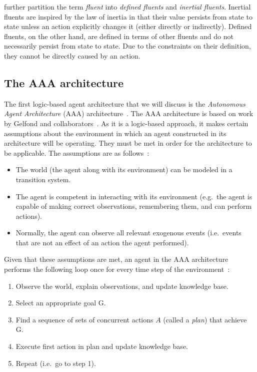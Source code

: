 \citet{gelfond_knowledge_2014} further partition the term \textit{fluent} into \textit{defined fluents} and \textit{inertial fluents}.
Inertial fluents are inspired by the law of inertia in that their value persists from state to state unless an action explicitly changes it (either directly or indirectly).
Defined fluents, on the other hand, are defined in terms of other fluents and do not necessarily persist from state to state.
Due to the constraints on their definition, they cannot be directly caused by an action.


\subsection{The AAA architecture}
\label{subsec:aaa_architecture}

The first logic-based agent architecture that we will discuss is the \textit{Autonomous Agent Architecture} (AAA) architecture~\citep{balduccini_aaa_2008}.
The AAA architecture is based on work by Gelfond and collaborators~\citep{baral_reasoning_2000,balduccini_diagnostic_2003, balduccini_answer_2006,balduccini_learning_2007}.
As it is a logic-based approach, it makes certain assumptions about the environment in which an agent constructed in its architecture will be operating.
They must be met in order for the architecture to be applicable.
The assumptions are as follows~\citep{balduccini_aaa_2008}:

\begin{itemize}
    \item The world (the agent along with its environment) can be modeled in a transition system.
    \item The agent is competent in interacting with its environment (e.g.~the agent is capable of making correct observations, remembering them, and can perform actions).
    \item Normally, the agent can observe all relevant exogenous events (i.e.~events that are not an effect of an action the agent performed).
\end{itemize}

Given that these assumptions are met, an agent in the AAA architecture performs the following loop once for every time step of the environment~\citep{balduccini_aaa_2008}:

\begin{enumerate}
    \item Observe the world, explain observations, and update knowledge base.
    \item Select an appropriate goal G.
    \item Find a sequence of sets of concurrent actions $A$ (called a \textit{plan}) that achieve G.
    \item Execute first action in plan and update knowledge base.
    \item Repeat (i.e.~go to step 1).
\end{enumerate}

